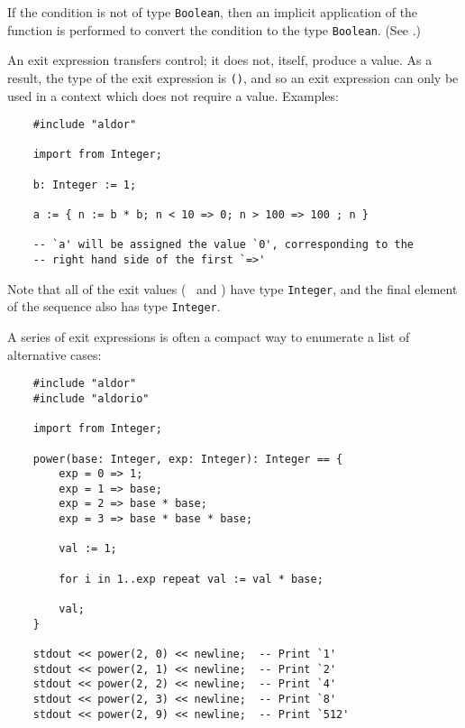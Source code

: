 If the condition is not of type \verb"Boolean", then an implicit
application of the function  is performed to convert the
condition to the type \verb"Boolean".  (See .)

%
An exit expression transfers control; it does not, itself, produce a
value.
As a result, the type of the exit expression is \verb"()", and so
an exit expression can only be used in a context which does not require
a value.
Examples:

\begin{small}
\begin{verbatim}
    #include "aldor"

    import from Integer;

    b: Integer := 1;

    a := { n := b * b; n < 10 => 0; n > 100 => 100 ; n }

    -- `a' will be assigned the value `0', corresponding to the
    -- right hand side of the first `=>'
\end{verbatim}
\end{small}

Note that all of the exit values (\ie{}~ and )
have type \verb"Integer", and the final element of the sequence
also has type \verb"Integer".

A series of exit expressions is often a compact way to enumerate
a list of alternative cases:

\begin{small}
\begin{verbatim}
    #include "aldor"
    #include "aldorio"

    import from Integer;

    power(base: Integer, exp: Integer): Integer == {
        exp = 0 => 1;
        exp = 1 => base;
        exp = 2 => base * base;
        exp = 3 => base * base * base;

        val := 1;

        for i in 1..exp repeat val := val * base;

        val;
    }

    stdout << power(2, 0) << newline;  -- Print `1'
    stdout << power(2, 1) << newline;  -- Print `2'
    stdout << power(2, 2) << newline;  -- Print `4'
    stdout << power(2, 3) << newline;  -- Print `8'
    stdout << power(2, 9) << newline;  -- Print `512'
\end{verbatim}
\end{small}


